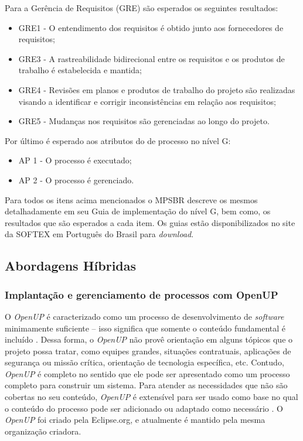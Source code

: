 \documentclass{acm_proc_article-sp}
\begin{document}
Para a Gerência de Requisitos (GRE) são esperados os seguintes resultados:
\begin{itemize}
\item GRE1 - O entendimento dos requisitos é obtido junto aos fornecedores de requisitos;
\item GRE3 - A rastreabilidade bidirecional entre os requisitos e os produtos de trabalho é estabelecida e mantida;
\item GRE4 - Revisões em planos e produtos de trabalho do projeto são realizadas visando a identificar e corrigir inconsistências em relação aos requisitos;
\item GRE5 - Mudanças nos requisitos são gerenciadas ao longo do projeto.
\end{itemize}

Por último é esperado aos atributos do de processo no nível G:
\begin{itemize}
\item AP 1 - O processo é executado;
\item AP 2 - O processo é gerenciado.
\end{itemize}

Para todos os itens acima mencionados o MPSBR \cite{mpsbr:nAgil} descreve os mesmos detalhadamente em seu Guia de implementação do nível G, bem como, os resultados que são esperados a cada item. Os guias estão disponibilizados no site da SOFTEX em Português do Brasil para \textit{download}.


\subsection{Abordagens Híbridas}

\subsubsection{Implantação e gerenciamento de processos com OpenUP}
O \textit{OpenUP} é caracterizado como um processo de desenvolvimento de \textit{software} minimamente suficiente – isso
significa que somente o conteúdo fundamental é incluído \cite{openUP:agil}. Dessa forma, o \textit{OpenUP} não provê orientação em
alguns tópicos que o projeto possa tratar, como equipes grandes, situações contratuais, aplicações de segurança ou missão crítica, orientação de tecnologia específica, etc. Contudo, \textit{OpenUP} é completo no sentido que ele pode ser apresentado como um processo completo para construir um sistema. Para atender as necessidades que não são cobertas no seu conteúdo, \textit{OpenUP} é extensível para ser usado como base no qual o conteúdo do processo pode ser adicionado ou adaptado como necessário \cite{openUP:agil}. O \textit{OpenUP} foi criado pela Eclipse.org, e atualmente é mantido pela mesma organização criadora.
\end{document}
